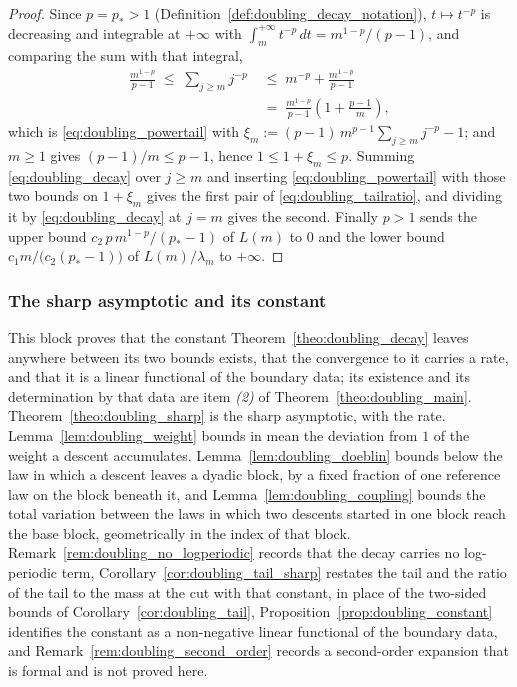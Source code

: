 \begin{proof}
Since $p=p_*>1$ (Definition~\ref{def:doubling_decay_notation}), $t\mapsto t^{-p}$
is decreasing and integrable at $+\infty$ with $\int_m^{+\infty}t^{-p}\,dt=m^{1-p}/(p-1)$, and
comparing the sum with that integral,
\begin{equation}
\begin{aligned}
    \frac{m^{1-p}}{p-1}\;\leq\;\sum_{j\geq m}j^{-p}
    \;&\leq\;m^{-p}+\frac{m^{1-p}}{p-1}\\
    \;&=\;\frac{m^{1-p}}{p-1}\left(1+\frac{p-1}{m}\right) ,
\end{aligned}
\end{equation}
which is \eqref{eq:doubling_powertail} with
$\xi_m:=(p-1)\,m^{p-1}\sum_{j\geq m}j^{-p}-1$; and $m\geq1$ gives $(p-1)/m\leq p-1$, hence
$1\leq1+\xi_m\leq p$. Summing \eqref{eq:doubling_decay} over $j\geq m$ and inserting
\eqref{eq:doubling_powertail} with those two bounds on $1+\xi_m$ gives the first pair of
\eqref{eq:doubling_tailratio}, and dividing it by \eqref{eq:doubling_decay} at $j=m$ gives the
second. Finally $p>1$ sends the upper bound $c_2\,p\,m^{1-p}/(p_*-1)$ of $L(m)$ to $0$ and the
lower bound $c_1m/\bigl(c_2(p_*-1)\bigr)$ of $L(m)/\lambda_m$ to $+\infty$.
\end{proof}

\subsubsection{The sharp asymptotic and its constant}

This block proves that the constant Theorem~\ref{theo:doubling_decay} leaves anywhere between
its two bounds exists, that the convergence to it carries a rate, and that it is a linear
functional of the boundary data; its existence and its determination by that data are item
\emph{(2)} of Theorem~\ref{theo:doubling_main}. Theorem~\ref{theo:doubling_sharp} is the sharp
asymptotic, with the rate. Lemma~\ref{lem:doubling_weight} bounds in mean the deviation from
$1$ of the weight a descent accumulates. Lemma~\ref{lem:doubling_doeblin} bounds below the law
in which a descent leaves a dyadic block, by a fixed fraction of one reference law on the block
beneath it, and Lemma~\ref{lem:doubling_coupling} bounds the total variation between the laws
in which two descents started in one block reach the base block, geometrically in the index of
that block. Remark~\ref{rem:doubling_no_logperiodic} records that the decay carries no
log-periodic term, Corollary~\ref{cor:doubling_tail_sharp} restates the tail and the ratio of
the tail to the mass at the cut with that constant, in place of the two-sided bounds of
Corollary~\ref{cor:doubling_tail}, Proposition~\ref{prop:doubling_constant} identifies the
constant as a non-negative linear functional of the boundary data, and
Remark~\ref{rem:doubling_second_order} records a second-order expansion that is formal and is
not proved here.

